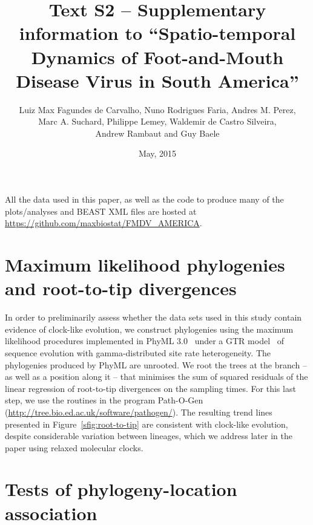 \documentclass[a4paper,10pt]{article}
\title{Text S2 -- Supplementary information to ``Spatio-temporal Dynamics of Foot-and-Mouth Disease Virus in South America''}
\author{
Luiz Max Fagundes de Carvalho, Nuno Rodrigues Faria, Andres M. Perez,\\
Marc A. Suchard, Philippe Lemey, Waldemir de Castro Silveira,\\
Andrew Rambaut and Guy Baele
}
\date{May, 2015}
\begin{document}
\maketitle

All the data used in this paper, as well as the code to produce many of the plots/analyses and BEAST XML files are hosted at \url{https://github.com/maxbiostat/FMDV_AMERICA}.

\section*{Maximum likelihood phylogenies and root-to-tip divergences}

In order to preliminarily assess whether the data sets used in this study contain evidence of clock-like evolution, we construct phylogenies using the maximum likelihood procedures implemented in PhyML 3.0~\cite{M-phyml} under a GTR model~\cite{M-Tavare1986} of sequence evolution with gamma-distributed site rate heterogeneity.
The phylogenies produced by PhyML are unrooted.
We root the trees at the branch -- as well as a position along it -- that minimises the sum of squared residuals of the linear regression of root-to-tip divergences on the sampling times.
For this last step, we use the routines in the program Path-O-Gen (\url{http://tree.bio.ed.ac.uk/software/pathogen/}).
The resulting trend lines presented in Figure~\ref{sfig:root-to-tip} are consistent with clock-like evolution, despite considerable variation between lineages, which we address later in the paper using relaxed molecular clocks.

\section*{Tests of phylogeny-location association}
\end{document}
